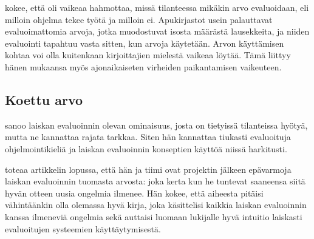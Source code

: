 \citet{sampson2009experience} kokee, että oli vaikeaa hahmottaa, missä tilanteessa mikäkin arvo evaluoidaan, eli milloin ohjelma tekee työtä ja milloin ei. Apukirjastot usein palauttavat evaluoimattomia arvoja, jotka muodostuvat isosta määrästä lausekkeita, ja niiden evaluointi tapahtuu vasta sitten, kun arvoja käytetään. Arvon käyttämisen kohtaa voi olla kuitenkaan kirjoittajien mielestä vaikeaa löytää. Tämä liittyy hänen mukaansa myös ajonaikaiseten virheiden paikantamisen vaikeuteen.

\subsection{Koettu arvo}

\citet{vesakarvonen} sanoo laiskan evaluoinnin olevan ominaisuus, josta on tietyissä tilanteissa hyötyä, mutta ne kannattaa rajata tarkkaa. Siten hän kannattaa tiukasti evaluoituja ohjelmointikieliä ja laiskan evaluoinnin konseptien käyttöä niissä harkitusti.

\citet{sampson2009experience} toteaa artikkelin lopussa, että hän ja tiimi ovat projektin jälkeen epävarmoja laiskan evaluoinnin tuomasta arvosta: joka kerta kun he tuntevat saaneensa siitä hyvän otteen uusia ongelmia ilmenee. Hän kokee, että aiheesta pitäisi vähintäänkin olla olemassa hyvä kirja, joka käsittelisi kaikkia laiskan evaluoinnin kanssa ilmeneviä ongelmia sekä auttaisi luomaan lukijalle hyvä intuitio laiskasti evaluoitujen systeemien käyttäytymisestä.

